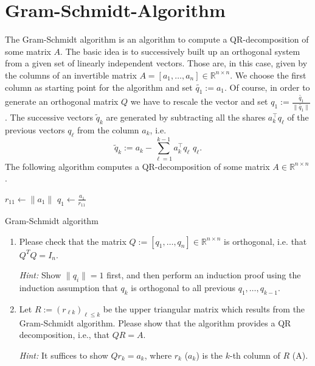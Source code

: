 \section{Gram-Schmidt-Algorithm}
{\color{darkgray}
	The Gram-Schmidt algorithm is an algorithm to compute a QR-decomposition of some matrix $A$.
	The basic idea is to successively 
	built up an orthogonal system from a given set of linearly independent vectors. Those are, in this case, given by the columns of an invertible matrix 
	$A = [a_1, \dots, a_n] \in \mathbb{R}^{n\times n}$.
	We choose the first column as starting point for the algorithm and set $\widetilde{q_1} := a_1$. 
	Of course, in order to generate an orthogonal matrix $Q$ we have to rescale the vector and set
	$q_1 := \frac{\widetilde{q_1}}{\| \widetilde{q_1} \|}$.
	The successive vectors $\widetilde{q}_k$ are generated by
	subtracting all the shares $a_k^\top q_\ell$ of the previous vectors $q_\ell$ from the column $a_k$, i.e.
	$$
	\widetilde{q}_k := a_k - \sum_{\ell = 1}^{k-1} a_k^\top q_\ell \,\, q_\ell.
	$$
}
The following algorithm computes a QR-decomposition of some matrix $A \in \mathbb{R}^{n \times n}$.
\begin{algorithm}
	$r_{11} \gets \| a_1 \|$\;
	$q_1 \gets \frac{a_1}{r_{11}}$\;
	\caption{Gram-Schmidt algorithm}
\end{algorithm}
\begin{enumerate}
	\item Please check that the matrix $Q := [q_1, \dots, q_n] \in \mathbb{R}^{n \times n}$ is orthogonal, i.e. that $Q^TQ = I_n$.
	
	\textit{Hint: } Show $\| q_i\| = 1$ first, and then perform an induction proof using the induction assumption that $q_k$ is orthogonal to
	all previous $ q_1,\dots, q_{k-1}$.
	
	\item Let $R := \left(r_{\ell k}\right)_{\ell \leq k}$ be the upper triangular matrix which results from the Gram-Schmidt algorithm. Please show that the algorithm provides a QR decomposition, i.e., that $QR = A$.
	
	\textit{Hint: } It suffices to show $Q r_k = a_k$, where $r_k$ ($a_k$) is the $k$-th column of $R$ (A).
\end{enumerate}